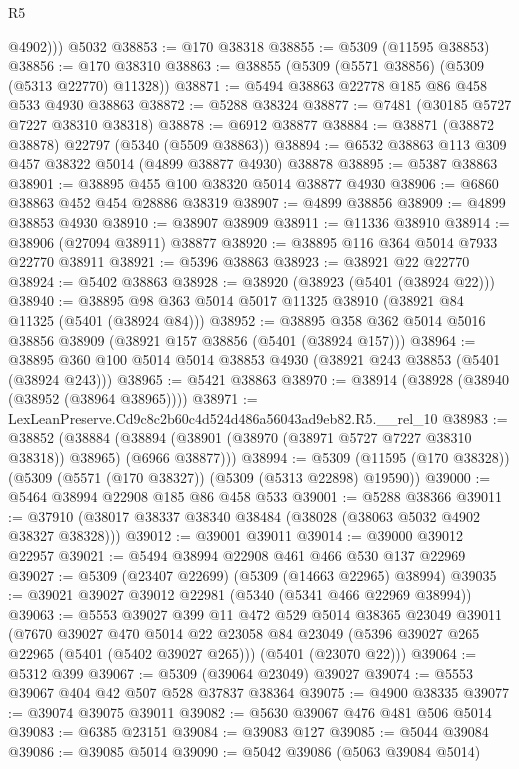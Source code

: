 \begin{lexlean}{R5}
\begin{coremodule}
          @4902)))
    @5032
@38853 := @170 @38318
@38855 := @5309 (@11595 @38853)
@38856 := @170 @38310
@38863 := @38855 (@5309 (@5571 @38856) (@5309 (@5313 @22770) @11328))
@38871 := @5494 @38863 @22778 @185 @86 @458 @533 @4930 @38863
@38872 := @5288 @38324
@38877 := @7481 (@30185 @5727 @7227 @38310 @38318)
@38878 := @6912 @38877
@38884 := @38871 (@38872 @38878) @22797 (@5340 (@5509 @38863))
@38894 := @6532 @38863 @113 @309 @457 @38322 @5014 (@4899 @38877 @4930) @38878
@38895 := @5387 @38863
@38901 := @38895 @455 @100 @38320 @5014 @38877 @4930
@38906 := @6860 @38863 @452 @454 @28886 @38319
@38907 := @4899 @38856
@38909 := @4899 @38853 @4930
@38910 := @38907 @38909
@38911 := @11336 @38910
@38914 := @38906 (@27094 @38911) @38877
@38920 := @38895 @116 @364 @5014 @7933 @22770 @38911
@38921 := @5396 @38863
@38923 := @38921 @22 @22770
@38924 := @5402 @38863
@38928 := @38920 (@38923 (@5401 (@38924 @22)))
@38940 := @38895 @98 @363 @5014 @5017 @11325 @38910 (@38921 @84 @11325 (@5401 (@38924 @84)))
@38952 := @38895 @358 @362 @5014 @5016 @38856 @38909 (@38921 @157 @38856 (@5401 (@38924 @157)))
@38964 := @38895 @360 @100 @5014 @5014 @38853 @4930 (@38921 @243 @38853 (@5401 (@38924 @243)))
@38965 := @5421 @38863
@38970 := @38914 (@38928 (@38940 (@38952 (@38964 @38965))))
@38971 := LexLeanPreserve.Cd9c8c2b60c4d524d486a56043ad9eb82.R5.__rel_10
@38983 := @38852
    (@38884 (@38894 (@38901 (@38970 (@38971 @5727 @7227 @38310 @38318)) @38965) (@6966 @38877)))
@38994 := @5309 (@11595 (@170 @38328)) (@5309 (@5571 (@170 @38327)) (@5309 (@5313 @22898) @19590))
@39000 := @5464 @38994 @22908 @185 @86 @458 @533
@39001 := @5288 @38366
@39011 := @37910 (@38017 @38337 @38340 @38484 (@38028 (@38063 @5032 @4902 @38327 @38328)))
@39012 := @39001 @39011
@39014 := @39000 @39012 @22957
@39021 := @5494 @38994 @22908 @461 @466 @530 @137 @22969
@39027 := @5309 (@23407 @22699) (@5309 (@14663 @22965) @38994)
@39035 := @39021 @39027 @39012 @22981 (@5340 (@5341 @466 @22969 @38994))
@39063 := @5553
    @39027
    @399
    @11
    @472
    @529
    @5014
    @38365
    @23049
    @39011
    (@7670
      @39027
      @470
      @5014
      @22
      @23058
      @84
      @23049
      (@5396 @39027 @265 @22965 (@5401 (@5402 @39027 @265)))
      (@5401 (@23070 @22)))
@39064 := @5312 @399
@39067 := @5309 (@39064 @23049) @39027
@39074 := @5553 @39067 @404 @42 @507 @528 @37837 @38364
@39075 := @4900 @38335
@39077 := @39074 @39075 @39011
@39082 := @5630 @39067 @476 @481 @506 @5014
@39083 := @6385 @23151
@39084 := @39083 @127
@39085 := @5044 @39084
@39086 := @39085 @5014
@39090 := @5042 @39086 (@5063 @39084 @5014)

\end{coremodule}
\end{lexlean}
